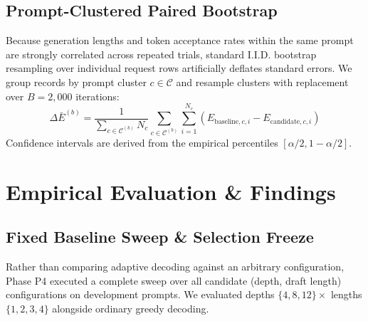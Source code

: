 \documentclass[10pt,twocolumn,letterpaper]{article}
\begin{document}
\subsection{Prompt-Clustered Paired Bootstrap}
Because generation lengths and token acceptance rates within the same prompt are strongly correlated across repeated trials, standard I.I.D. bootstrap resampling over individual request rows artificially deflates standard errors. We group records by prompt cluster $c \in \mathcal{C}$ and resample clusters with replacement over $B = 2,000$ iterations:
\begin{equation}
\Delta \bar{E}^{(b)} = \frac{1}{\sum_{c \in \mathcal{C}^{(b)}} N_c} \sum_{c \in \mathcal{C}^{(b)}} \sum_{i=1}^{N_c} \left( E_{\text{baseline}, c, i} - E_{\text{candidate}, c, i} \right)
\end{equation}
Confidence intervals are derived from the empirical percentiles $[\alpha/2, 1 - \alpha/2]$.

\section{Empirical Evaluation \& Findings}

\subsection{Fixed Baseline Sweep \& Selection Freeze}
Rather than comparing adaptive decoding against an arbitrary configuration, Phase P4 executed a complete sweep over all candidate (depth, draft length) configurations on development prompts. We evaluated depths $\{4, 8, 12\} \times$ lengths $\{1, 2, 3, 4\}$ alongside ordinary greedy decoding.
\end{document}
